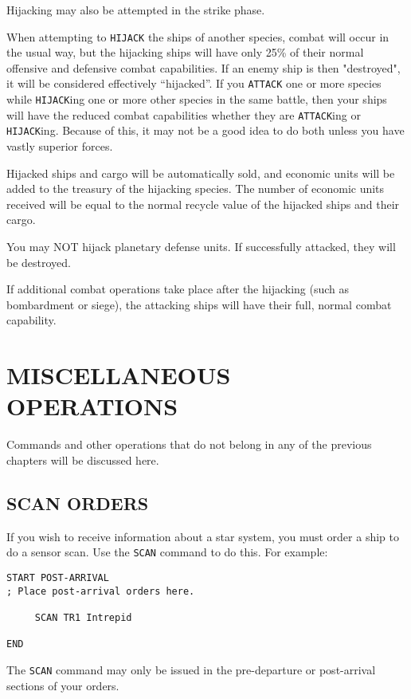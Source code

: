 \documentclass[10pt,titlepage]{article}
\begin{document}
Hijacking may also be attempted in the strike phase.

When attempting to \texttt{HIJACK} the ships of another species, combat will occur in
the usual way, but the hijacking ships will have only 25\% of their normal
offensive and defensive combat capabilities.  If an enemy ship is then
"destroyed", it will be considered effectively ``hijacked''.  If you \texttt{ATTACK} one
or more species while \texttt{HIJACK}ing one or more other species in the same battle,
then your ships will have the reduced combat capabilities whether they are
\texttt{ATTACK}ing or \texttt{HIJACK}ing.  Because of this, it may not be a good idea to do both
unless you have vastly superior forces.

Hijacked ships and cargo will be automatically sold, and economic units will be
added to the treasury of the hijacking species.  The number of economic units
received will be equal to the normal recycle value of the hijacked ships and
their cargo.

You may NOT hijack planetary defense units.  If successfully attacked, they
will be destroyed.

If additional combat operations take place after the hijacking (such as
bombardment or siege), the attacking ships will have their full, normal
combat capability.

\section{MISCELLANEOUS OPERATIONS}
\label{sec:miscoperations}


Commands and other operations that do not belong in any of the previous
chapters will be discussed here.


\subsection{SCAN ORDERS}
\label{sec:scanorders}


If you wish to receive information about a star system, you must order a ship
to do a sensor scan.  Use the \texttt{SCAN} command to do this.  For example:

\begin{verbatim}
START POST-ARRIVAL
; Place post-arrival orders here.

     SCAN TR1 Intrepid

END\end{verbatim} 

The \texttt{SCAN} command may only be issued in the pre-departure or post-arrival
sections of your orders.
\end{document}
